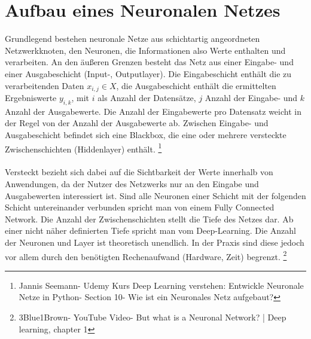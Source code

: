 \documentclass[a4paper]{scrreprt}
\begin{document}
\section{Aufbau eines Neuronalen Netzes}
Grundlegend  bestehen neuronale Netze aus schichtartig angeordneten Netzwerkknoten, den Neuronen, die Informationen also Werte enthalten und verarbeiten. An den äußeren Grenzen besteht das Netz aus einer Eingabe- und einer Ausgabeschicht (Input-, Outputlayer). Die Eingabeschicht enthält die zu verarbeitenden Daten $x_{i,j} \in X$, die Ausgabeschicht enthält die ermittelten Ergebniswerte $y_{i,k}$, mit $i$ als Anzahl der Datensätze, $j$ Anzahl der Eingabe- und $k$ Anzahl der Ausgabewerte. Die Anzahl der Eingabewerte pro Datensatz weicht in der Regel von der Anzahl der Ausgabewerte ab. Zwischen Eingabe- und Ausgabeschicht befindet sich eine Blackbox, die eine oder mehrere versteckte Zwischenschichten (Hiddenlayer) enthält.
\footnote{Jannis Seemann- Udemy Kurs Deep Learning verstehen: Entwickle Neuronale Netze in Python- Section 10- Wie ist ein Neuronales Netz aufgebaut?}
\\\\ 
Versteckt bezieht sich dabei auf die Sichtbarkeit der Werte innerhalb von Anwendungen, da der Nutzer des Netzwerks nur an den Eingabe und Ausgabewerten interessiert ist. Sind alle Neuronen einer Schicht mit der folgenden Schicht untereinander verbunden spricht man von einem Fully Connected Network. Die Anzahl der Zwischenschichten stellt die Tiefe des Netzes dar. Ab einer nicht näher definierten Tiefe spricht man vom Deep-Learning. Die Anzahl der Neuronen und Layer ist theoretisch unendlich. In der Praxis sind diese jedoch vor allem durch den benötigten Rechenaufwand (Hardware, Zeit) begrenzt.
\footnote{3Blue1Brown- YouTube Video- But what is a Neuronal Network? | Deep learning, chapter 1}
\end{document}
